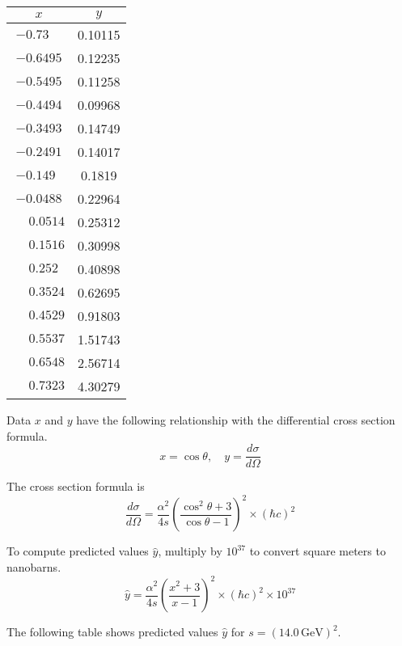 \documentclass[12pt]{article}
\begin{document}
\begin{center}
\begin{tabular}{|c|c|}
\hline
$x$ & $y$\\
\hline
$-0.73\phantom{00}$ & 0.10115\\
$-0.6495$ & 0.12235\\
$-0.5495$ & 0.11258\\
$-0.4494$ & 0.09968\\
$-0.3493$ & 0.14749\\
$-0.2491$ & 0.14017\\
$-0.149\phantom{0}$ & 0.1819\phantom{0}\\
$-0.0488$ & 0.22964\\
$\phantom{+}0.0514$ & 0.25312\\
$\phantom{+}0.1516$ & 0.30998\\
$\phantom{+}0.252\phantom{0}$ & 0.40898\\
$\phantom{+}0.3524$ & 0.62695\\
$\phantom{+}0.4529$ & 0.91803\\
$\phantom{+}0.5537$ & 1.51743\\
$\phantom{+}0.6548$ & 2.56714\\
$\phantom{+}0.7323$ & 4.30279\\
\hline
\end{tabular}
\end{center}

Data $x$ and $y$ have the following relationship with the differential cross section formula.
\begin{equation*}
x=\cos\theta,
\quad
y=\frac{d\sigma}{d\Omega}
\end{equation*}

The cross section formula is
\begin{equation*}
\frac{d\sigma}{d\Omega}
=\frac{\alpha^2}{4s}
\left(\frac{\cos^2\theta+3}{\cos\theta-1}\right)^2\times(\hbar c)^2
\end{equation*}

To compute predicted values $\hat{y}$, multiply by $10^{37}$ to convert square meters to nanobarns.
\begin{equation*}
\hat{y}
=\frac{\alpha^2}{4s}
\left(\frac{x^2+3}{x-1}\right)^2
\times(\hbar c)^2
\times10^{37}
\end{equation*}

The following table shows predicted values $\hat{y}$ for $s=(14.0\,\text{GeV})^2$.
\end{document}
